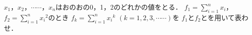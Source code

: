 \documentclass[../../main.tex]{subfiles}
\begin{document}
$x_1$，$x_2$，$\cdots\cdots$，$x_n$はおのおの0，1，2のどれかの値をとる．
$\displaystyle f_1=\sum_{i=1}^n x_i$，$\displaystyle f_2=\sum_{i=1}^n {x_i}^2$のとき
$\displaystyle f_k=\sum_{i=1}^n {x_i}^k$ $(k=1,2,3,\cdots\cdots)$を
$f_1$と$f_2$とを用いて表わせ．
\end{document}
